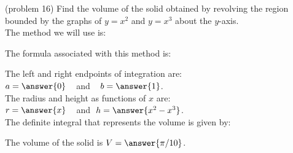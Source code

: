 \documentclass[handout]{ximera}
\begin{document}
\begin{problem}(problem 16)
Find the volume of the solid obtained by revolving the region bounded by the graphs of $y = x^2$ and $y = x^3$ about the $y$-axis.\\
The method we will use is:
\begin{multipleChoice}
\end{multipleChoice}

The formula associated with this method is:
\begin{multipleChoice}
\end{multipleChoice}

The left and right endpoints of integration are:\\
$a = \answer{0}\;\;\;$ and $\;\;\; b = \answer{1}$.\\
The radius and height as functions of $x$ are:\\
$r = \answer{x} \;\;\;$ and $\; h = \answer{x^2 -x^3}$.\\

The definite integral that represents the volume is given by:\\
\begin{multipleChoice}
\end{multipleChoice}

The volume of the solid is $V = \answer{\pi/10}$.

\end{problem}
\end{document}
